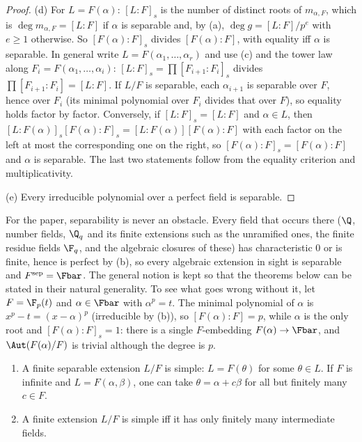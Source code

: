 \begin{proof}
(d) For $L=F(\alpha)$: $[L:F]_s$ is the number of distinct roots of $m_{\alpha,F}$, which is $\deg m_{\alpha,F}=[L:F]$ if $\alpha$ is separable and, by (a),
$\deg g=[L:F]/p^e$ with $e\ge1$ otherwise. So $[F(\alpha):F]_s$ divides $[F(\alpha):F]$, with equality iff $\alpha$ is separable. In general write
$L=F(\alpha_1,\dots,\alpha_r)$ and use (c) and the tower law along $F_i=F(\alpha_1,\dots,\alpha_i)$: $[L:F]_s=\prod[F_{i+1}:F_i]_s$ divides $\prod[F_{i+1}:F_i]=[L:F]$.
If $L/F$ is separable, each $\alpha_{i+1}$ is separable over $F$, hence over $F_i$ (its minimal polynomial over $F_i$ divides that over $F$), so equality holds
factor by factor. Conversely, if $[L:F]_s=[L:F]$ and $\alpha\in L$, then $[L:F(\alpha)]_s[F(\alpha):F]_s=[L:F(\alpha)][F(\alpha):F]$ with each factor on the left at
most the corresponding one on the right, so $[F(\alpha):F]_s=[F(\alpha):F]$ and $\alpha$ is separable. The last two statements follow from the equality
criterion and multiplicativity.

(e) Every irreducible polynomial over a perfect field is separable.
\end{proof}

For the paper, separability is never an obstacle. Every field that occurs there ($\Q$, number fields, $\Q_q$ and its finite extensions such as the unramified
ones, the finite residue fields $\F_q$, and the algebraic closures of these) has characteristic $0$ or is finite, hence is perfect by (b), so every algebraic
extension in sight is separable and $F^{\mathrm{sep}}=\Fbar$. The general notion is kept so that the theorems below can be stated in their natural generality.
To see what goes wrong without it, let $F=\F_p(t)$ and $\alpha\in\Fbar$ with $\alpha^p=t$. The minimal polynomial of $\alpha$ is $x^p-t=(x-\alpha)^p$ (irreducible
by (b)), so $[F(\alpha):F]=p$, while $\alpha$ is the only root and $[F(\alpha):F]_s=1$: there is a single $F$-embedding $F(\alpha)\to\Fbar$, and
$\Aut(F(\alpha)/F)$ is trivial although the degree is $p$.

\begin{theorem}\label{thm:galois:primitive-element}
\begin{enumerate}[label=(\alph*)]
\item A finite separable extension $L/F$ is simple: $L=F(\theta)$ for some $\theta\in L$. If $F$ is infinite and $L=F(\alpha,\beta)$, one can take
$\theta=\alpha+c\beta$ for all but finitely many $c\in F$.
\item A finite extension $L/F$ is simple iff it has only finitely many intermediate fields.
\end{enumerate}
\end{theorem}


